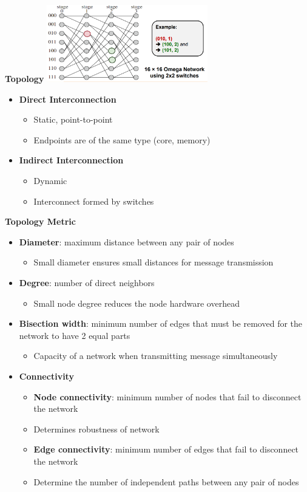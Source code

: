 \documentclass[10pt, landscape]{article}
\begin{document}
\begin{multicols}{4}
\textbf{Topology}
\includegraphics*[width=7cm]{interconnect.png}
\begin{itemize}
    \item \textbf{Direct Interconnection}
    \begin{itemize}
        \item Static, point-to-point 
        \item Endpoints are of the same type (core, memory)
    \end{itemize}
    \item \textbf{Indirect Interconnection}
    \begin{itemize}
        \item Dynamic 
        \item Interconnect formed by switches
    \end{itemize}
\end{itemize}

\textbf{Topology Metric}
\begin{itemize}
    \item \textbf{Diameter}: maximum distance between any pair of nodes 
    \begin{itemize}
        \item Small diameter ensures small distances for message transmission
    \end{itemize}
    \item \textbf{Degree}: number of direct neighbors 
    \begin{itemize}
        \item Small node degree reduces the node hardware overhead
    \end{itemize}
    \item \textbf{Bisection width}: minimum number of edges that must be removed for the network to have 2 equal parts 
    \begin{itemize}
        \item Capacity of a network when transmitting message simultaneously
    \end{itemize}
    \item \textbf{Connectivity} 
    \begin{itemize}
        \item \textbf{Node connectivity}: minimum number of nodes that fail to disconnect the network
        \item Determines robustness of network
        \item \textbf{Edge connectivity}: minimum number of edges that fail to disconnect the network
        \item Determine the number of independent paths between any pair of nodes
    \end{itemize}
\end{itemize}



\end{multicols}
\end{document}
